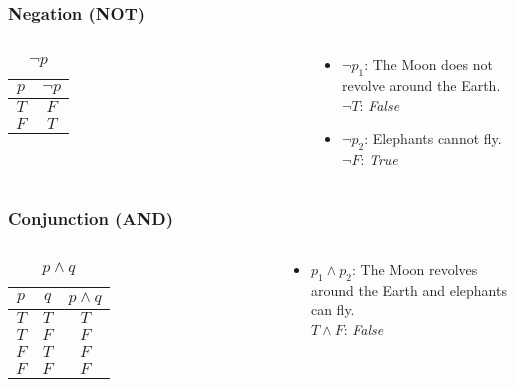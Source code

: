 \documentclass[dvipsnames]{beamer}
\begin{document}
\begin{frame}
  \frametitle{Negation (NOT)}

  \begin{columns}
    \begin{table}
      \caption{$\neg p$}
      \begin{tabular}{|c||c|}\hline
        $p$ & $\neg p$\\\hline\hline
        $T$ & $F$\\\hline
        $F$ & $T$\\\hline
      \end{tabular}
    \end{table}

    \pause
    \begin{example}
      \begin{itemize}
        \item $\neg p_1$: The Moon does not revolve around the Earth.\\
          $\neg T$: \emph{False}
        \item $\neg p_2$: Elephants cannot fly.\\
          $\neg F$: \emph{True}
      \end{itemize}
    \end{example}
  \end{columns}
\end{frame}

\begin{frame}
  \frametitle{Conjunction (AND)}

  \begin{columns}
    \begin{table}
      \caption{$p \wedge q$}
      \begin{tabular}{|c|c||c|}\hline
        $p$ & $q$ & $p \wedge q$\\\hline\hline
        $T$ & $T$ & $T$\\\hline
        $T$ & $F$ & $F$\\\hline
        $F$ & $T$ & $F$\\\hline
        $F$ & $F$ & $F$\\\hline
      \end{tabular}
    \end{table}

    \pause
    \begin{example}
      \begin{itemize}
        \item $p_1 \wedge p_2$: The Moon revolves around the Earth and elephants
          can fly.\\
          $T \wedge F$: \emph{False}
      \end{itemize}
    \end{example}
  \end{columns}
\end{frame}
\end{document}
